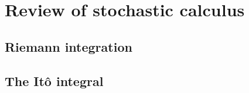 
\section{Review of stochastic calculus}
\subsection{Riemann integration}


\subsection{The It\^o integral}


